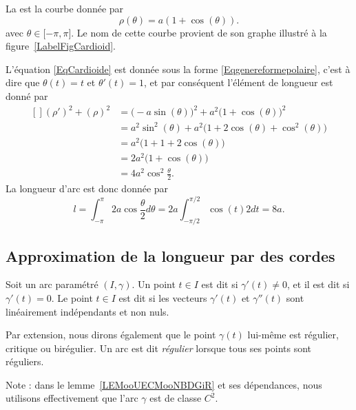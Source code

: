 \begin{example}
    La  est la courbe donnée par
    \begin{equation}        \label{EqCardioide}
        \rho(\theta)=a(1+\cos(\theta)).
    \end{equation}
    avec $\theta\in\mathopen[ -\pi , \pi \mathclose]$. Le nom de cette courbe provient de son graphe illustré à la figure~\ref{LabelFigCardioid}.
    \newcommand{\CaptionFigCardioid}{Une cardioïde, $\rho=1+\cos(\theta)$.}
    

    L'équation \eqref{EqCardioide} est donnée sous la forme \eqref{Eqgenereformepolaire}, c'est à dire que $\theta(t)=t$ et $\theta'(t)=1$, et par conséquent l'élément de longueur est donné par
    \begin{equation}
        \begin{aligned}[]
            (\rho')^2+(\rho)^2&=\big( -a\sin(\theta) \big)^2+a^2\big( 1+\cos(\theta) \big)^2\\
                    &=a^2\sin^2(\theta)+a^2\big( 1+2\cos(\theta)+\cos^2(\theta) \big)\\
                    &=a^2\big( 1+1+2\cos(\theta) \big)\\
                    &=2a^2\big( 1+\cos(\theta) \big)\\
                    &=4a^2\cos^2\frac{ \theta }{2}.
        \end{aligned}
    \end{equation}
    La longueur d'arc est donc donnée par
    \begin{equation}
        l=\int_{-\pi}^{\pi}2a\cos\frac{ \theta }{2}d\theta=2a\int_{-\pi/2}^{\pi/2}\cos(t)2dt=8a.
    \end{equation}
\end{example}

\subsection{Approximation de la longueur par des cordes}

\begin{definition}
    Soit un arc paramétré $(I,\gamma)$. Un point $t\in I$ est dit  si $\gamma'(t)\neq 0$, et il est dit  si $\gamma'(t)=0$. Le point $t\in I$ est dit  si les vecteurs $\gamma'(t)$ et $\gamma''(t)$ sont linéairement indépendants et non nuls.

    Par extension, nous dirons également que le point $\gamma(t)$ lui-même est régulier, critique ou birégulier. Un arc est dit \emph{régulier} lorsque tous ses points sont réguliers.
\end{definition}
Note : dans le lemme~\ref{LEMooUECMooNBDGiR} et ses dépendances, nous utilisons effectivement que l'arc \( \gamma\) est de classe \( C^2\).

